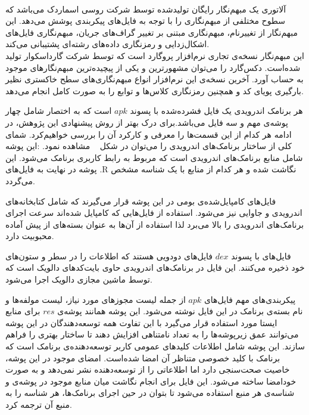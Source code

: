 \\
آلاتوری یک مبهم‌نگار رایگان تولید‌شده توسط شرکت روسی اسماردک می‌باشد که سطوح مختلفی از مبهم‌نگاری را با توجه به فایل‌های پیکر‌بندی پوشش می‌دهد. این مبهم‌نگار از تغییرنام، مبهم‌نگاری مبتنی بر تغییر گراف‌های جریان، مبهم‌نگاری فایل‌های اشکال‌زدایی و رمز‌نگاری داده‌های رشته‌ای پشتیبانی می‌کند.
\\
این مبهم‌نگار نسخه‌ی تجاری نرم‌افزار پروگارد است که توسط شرکت گارداسکوار تولید شده‌است. دکس‌گارد را می‌توان مشهورترین و یکی از پیچیده‌ترین مبهم‌نگار‌های موجود به حساب آورد. آخرین نسخه‌ی این نرم‌افزار انواع مبهم‌نگاری‌های سطح خاکستری نظیر بارگیری پویای کد و همچنین رمزنگاری کلاس‌ها و توابع را به صورت کامل انجام می‌دهد.


هر برنامک اندرویدی یک فایل فشرده‌شده با پسوند $apk$ است که به اختصار شامل چهار پوشه‌ی مهم و سه فایل می‌باشد.برای درک بهتر از روش پیشنهادی این پژوهش، در ادامه هر کدام از این قسمت‌ها را معرفی و کارکرد آن‌ را بررسی خواهیم‌کرد. شمای کلی از ساختار برنامک‌های اندرویدی را می‌توان در شکل ~ مشاهده نمود.
 :این پوشه شامل منابع برنامک‌های اندرویدی است که مربوط به رابط کاربری برنامک می‌شود. این پوشه در نهایت به فایل‌های {.R} نگاشت شده و هر کدام از منابع با یک شناسه مشخص می‌گردد.

  فایل‌های کامپایل‌شده‌ی بومی در این پوشه قرار می‌گیرند که شامل کتابخانه‌های اندرویدی و جاوایی نیز می‌شود. استفاده از فایل‌هایی که کامپایل شده‌اند سرعت اجرای برنامک‌های اندرویدی را بالا می‌برد لذا استفاده از آن‌ها به عنوان بسته‌‌های از پیش آماده محبوبیت دارد.

  فایل‌های با پسوند {$dex$} فایل‌های دودویی هستند که اطلاعات را در سطر و ستون‌های خود ذخیره می‌کنند. این فایل  در برنامک‌های اندرویدی حاوی بایت‌کد‌های دالویک است که توسط ماشین مجازی دالویک اجرا می‌شود.

  پیکر‌بندی‌های مهم فایل‌های $apk$ از جمله لیست مجوز‌های مورد نیاز، لیست مولفه‌ها و نام بسته‌ی برنامک در این فایل نوشته می‌شود.
  این پوشه همانند پوشه‌ی $res$ برای منابع ایستا مورد استفاده قرار می‌گیرد با این تفاوت همه توسعه‌دهندگان در این پوشه می‌توانند عمق زیر‌پوشه‌ها را به تعداد نامتناهی افزایش دهند تا ساختار بهتری را فراهم سازند.
  این پوشه شامل اطلاعات کلید‌‌های عمومی کاربر توسعه‌دهنده‌ی برنامک است که برنامک با کلید خصوصی متناظر آن امضا شده‌است. امضا‌ی موجود در این پوشه، خاصیت صحت‌سنجی دارد اما اطلاعاتی را از توسعه‌دهنده نشر نمی‌دهد و به صورت خود‌امضا ساخته‌ می‌شود.
  این فایل برای انجام نگاشت میان منابع موجود در پوشه‌ی  و شناسه‌ی هر منبع استفاده می‌شود تا بتوان در حین اجرای برنامک‌ها، هر شناسه‌ را به منبع آن ترجمه کرد.


